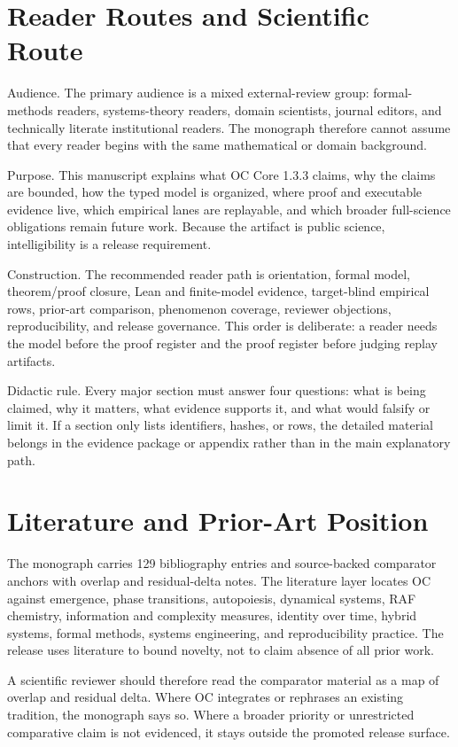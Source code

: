 \section{Reader Routes and Scientific Route}
\label{sec:oc133-reader-contract-scientific-route}
Audience. The primary audience is a mixed external-review group: formal-methods readers, systems-theory readers, domain scientists, journal editors, and technically literate institutional readers. The monograph therefore cannot assume that every reader begins with the same mathematical or domain background.

Purpose. This manuscript explains what OC Core 1.3.3 claims, why the claims are bounded, how the typed model is organized, where proof and executable evidence live, which empirical lanes are replayable, and which broader full-science obligations remain future work. Because the artifact is public science, intelligibility is a release requirement.

Construction. The recommended reader path is orientation, formal model, theorem/proof closure, Lean and finite-model evidence, target-blind empirical rows, prior-art comparison, phenomenon coverage, reviewer objections, reproducibility, and release governance. This order is deliberate: a reader needs the model before the proof register and the proof register before judging replay artifacts.

Didactic rule. Every major section must answer four questions: what is being claimed, why it matters, what evidence supports it, and what would falsify or limit it. If a section only lists identifiers, hashes, or rows, the detailed material belongs in the evidence package or appendix rather than in the main explanatory path.


\section{Literature and Prior-Art Position}
\label{sec:oc133-literature-prior-art-position}
The monograph carries 129 bibliography entries and source-backed comparator anchors with overlap and residual-delta notes. The literature layer locates OC against emergence, phase transitions, autopoiesis, dynamical systems, RAF chemistry, information and complexity measures, identity over time, hybrid systems, formal methods, systems engineering, and reproducibility practice. The release uses literature to bound novelty, not to claim absence of all prior work.

A scientific reviewer should therefore read the comparator material as a map of overlap and residual delta. Where OC integrates or rephrases an existing tradition, the monograph says so. Where a broader priority or unrestricted comparative claim is not evidenced, it stays outside the promoted release surface.



